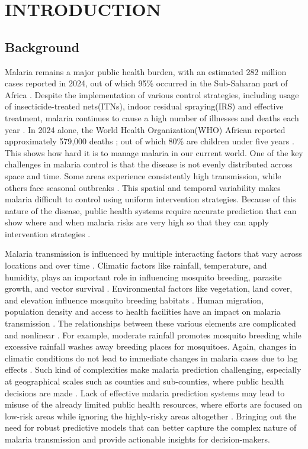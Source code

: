 \chapter{INTRODUCTION}
\section{Background }
Malaria remains a major public health burden, with an estimated 282 million cases reported in 2024, out of which 95\% occurred in the Sub-Saharan part of Africa \cite{WHO_malaria_2024}. Despite the implementation of various control strategies, including usage of insecticide-treated nets(ITNs), indoor residual spraying(IRS) and effective treatment, malaria continues to cause a high number of illnesses and deaths each year \cite{fullman2013nets}. In 2024 alone, the World Health Organization(WHO) African reported approximately 579,000 deaths ; out of which 80\% are children under five years \cite{WHO_malaria_2024}. This shows how hard it is to manage malaria in our current world. One of the key challenges in malaria control is that the disease is not evenly distributed across space and time. Some areas experience consistently high transmission, while others face seasonal outbreaks \cite{amek2012spatial}. This spatial and temporal variability makes malaria difficult to control using uniform intervention strategies. Because of this nature of the disease, public health systems require  accurate prediction that can show where and when malaria risks are very high so that they can apply intervention strategies \cite{Mategula2025}.

Malaria transmission is influenced by multiple interacting factors that vary across locations and over time \cite{Odhiambo2020,amek2012spatial}. Climatic factors like rainfall, temperature, and humidity, plays an important role in influencing mosquito breeding, parasite growth, and vector survival \cite{Caminade2023}.  Environmental factors like vegetation, land cover, and elevation influence mosquito breeding habitats \cite{Kuenzer2022}. Human migration, population density and access to health facilities have an impact on malaria transmission \cite{Chirebvu2014}. The relationships between these various elements are complicated and nonlinear \cite{Okundalaye2025Climate-based}. For example, moderate rainfall promotes mosquito breeding while excessive rainfall washes away breeding places for mosquitoes. Again, changes in climatic conditions do not lead to immediate changes in malaria cases due to lag effects \cite{Laneri2010}. Such  kind of complexities make malaria prediction challenging, especially at  geographical scales such as counties and sub-counties, where public health decisions are made \cite{Okunlola2019}. Lack of effective malaria prediction systems may lead to misuse of the already limited public health resources, where efforts are focused on low-risk areas while ignoring the highly-risky areas altogether \cite{Mategula2025}. Bringing out the need for robust predictive models that can better capture the complex nature of malaria transmission and provide actionable insights for decision-makers.

